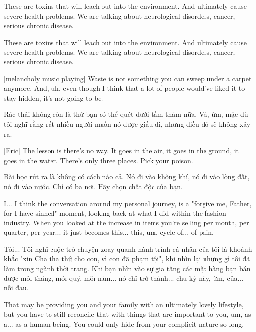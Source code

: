 \documentclass[a4paper]{article}
\begin{document}
	These are toxins that will leach out into the environment.
	And ultimately cause severe health problems. We are talking about neurological disorders, cancer, serious chronic disease.
	
	\begin{vietnamese-v2}
		These are toxins that will leach out into the environment.
		And ultimately cause severe health problems. We are talking about neurological disorders, cancer, serious chronic disease.
	\end{vietnamese-v2}
	
	[melancholy music playing]
	Waste is not something you can sweep under a carpet anymore.
	And, uh, even though I think that a lot of people would've liked it to stay hidden, it's not going to be.
	
	\begin{vietnamese-v2}
		Rác thải không còn là thứ bạn có thể quét dưới tấm thảm nữa.
		Và, ừm, mặc dù tôi nghĩ rằng rất nhiều người muốn nó được giấu đi, nhưng điều đó sẽ không xảy ra.
	\end{vietnamese-v2}
	
	[Eric] The lesson is there's no way.
	It goes in the air, it goes in the ground, it goes in the water.
	There's only three places.
	Pick your poison.
	
	\begin{vietnamese-v2}
		[Eric] Bài học rút ra là không có cách nào cả.
		Nó đi vào không khí, nó đi vào lòng đất, nó đi vào nước.
		Chỉ có ba nơi.
		Hãy chọn chất độc của bạn.
	\end{vietnamese-v2}
	
	I... I think the conversation around my personal journey, is a "forgive me, Father, for I have sinned" moment, looking back at what I did within the fashion industry.
	When you looked at the increase in items you're selling per month, per quarter, per year... it just becomes this... this, um, cycle of... of pain.
	
	\begin{vietnamese-v2}
		Tôi... Tôi nghĩ cuộc trò chuyện xoay quanh hành trình cá nhân của tôi là khoảnh khắc "xin Cha tha thứ cho con, vì con đã phạm tội", khi nhìn lại những gì tôi đã làm trong ngành thời trang.
		Khi bạn nhìn vào sự gia tăng các mặt hàng bạn bán được mỗi tháng, mỗi quý, mỗi năm... nó chỉ trở thành... chu kỳ này, ừm, của... nỗi đau.
	\end{vietnamese-v2}
	
	That may be providing you and your family with an ultimately lovely lifestyle, but you have to still reconcile that with things that are important to you, um, as a... as a human being.
	You could only hide from your complicit nature so long.
	
\end{document}
